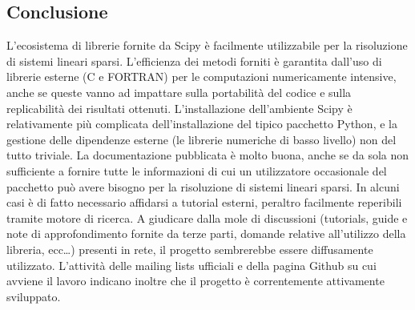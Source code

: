 \documentclass[11pt,a4paper]{scrartcl}
\begin{document}
\subsection*{Conclusione}
L'ecosistema di librerie fornite da Scipy è facilmente utilizzabile per la risoluzione di sistemi lineari sparsi. L'efficienza dei metodi forniti è garantita dall'uso di librerie esterne (C e FORTRAN) per le computazioni numericamente intensive, anche se queste vanno ad impattare sulla portabilità del codice e sulla replicabilità dei risultati ottenuti. L'installazione dell'ambiente Scipy è relativamente più complicata dell'installazione del tipico pacchetto Python, e la gestione delle dipendenze esterne (le librerie numeriche di basso livello) non del tutto triviale. La documentazione pubblicata è molto buona, anche se da sola non sufficiente a fornire tutte le informazioni di cui un utilizzatore occasionale del pacchetto può avere bisogno per la risoluzione di sistemi lineari sparsi. In alcuni casi è di fatto necessario affidarsi a tutorial esterni, peraltro facilmente reperibili tramite motore di ricerca. A giudicare dalla mole di discussioni (tutorials, guide e note di approfondimento fornite da terze parti, domande relative all'utilizzo della libreria, ecc\dots) presenti in rete, il progetto sembrerebbe essere diffusamente utilizzato. L'attività delle mailing lists ufficiali e della pagina Github su cui avviene il lavoro indicano inoltre che il progetto è correntemente attivamente sviluppato.
\end{document}
